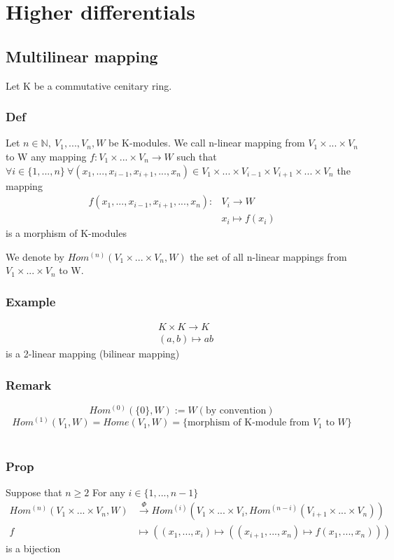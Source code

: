 \documentclass{book}
\begin{document}
\part{Higher differentials}
\chapter{Multilinear mapping}
Let K be a commutative cenitary ring.
\section{Def}
Let $n\in \mathbb{N},\ V_1,...,V_n,W$ be K-modules. We call n-linear mapping from $V_1\times...\times V_n$ to W any mapping $f:V_1\times...\times V_n\rightarrow W$ such that $\forall i\in \{1,...,n\}\ \forall(x_1,...,x_{i-1},x_{i+1},...,x_n)\in V_1\times...\times V_{i-1}\times V_{i+1}\times...\times V_n$ the mapping $$\begin{aligned}
    f(x_1,...,x_{i-1},x_{i+1},...,x_n): &V_i\rightarrow W\\ &x_i\mapsto f(x_i)
\end{aligned}$$
is a morphism of K-modules

We denote by $Hom^{(n)}(V_1\times...\times V_n,W)$ the set of all n-linear mappings from $V_1\times...\times V_n$ to W.
\section{Example}
$$\begin{aligned}
    &K\times K\rightarrow K\\
    &(a,b)\mapsto ab
\end{aligned}$$
is a 2-linear mapping (bilinear mapping)
\section{Remark}
$$Hom^{(0)}(\{0\},W):=W(\text{by convention})$$
$$Hom^{(1)}(V_1,W)=Home(V_1,W)=\{\text{morphism of K-module from }V_1 \text{ to } W\}$$\
\section{Prop}
Suppose that $n\geq 2$ For any $i\in \{1,...,n-1\}$
$$\begin{aligned}
    Hom^{(n)}(V_1\times...\times V_n,W) &\stackrel{\Phi}{\rightarrow} Hom^{(i)}(V_1\times...\times V_i,Hom^{(n-i)}(V_{i+1}\times...\times V_n))\\
    f &\mapsto ((x_1,...,x_i)\mapsto((x_{i+1},...,x_n)\mapsto f(x_1,...,x_n)))
\end{aligned}$$
is a bijection
\end{document}
